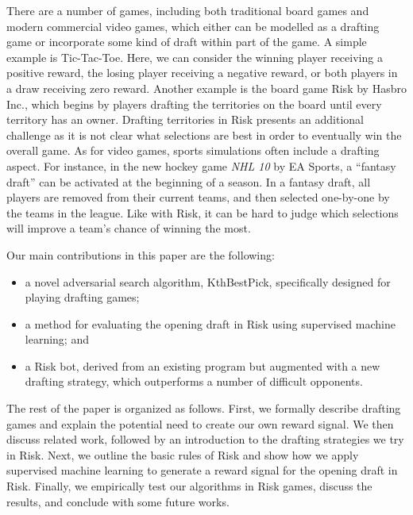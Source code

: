 \documentclass[letterpaper]{article}
\numberwithin{equation}{section}
\numberwithin{theorem}{section}
\numberwithin{lemma}{section}
\numberwithin{df}{section}
\begin{document}
There are a number of games, including both traditional board games and modern commercial video games, which either can be modelled as a drafting game or incorporate some kind of draft within part of the game.  A simple example is Tic-Tac-Toe. Here, we can consider the winning player receiving a positive reward, the losing player receiving a negative reward, or both players in a draw receiving zero reward. Another example is the board game Risk by Hasbro Inc., which begins by players drafting the territories on the board until every territory has an owner.  Drafting territories in Risk presents an additional challenge as it is not clear what selections are best in order to eventually win the overall game.  As for video games, sports simulations often include a drafting aspect.  For instance, %
in the new hockey game \textit{NHL 10} by EA Sports, a ``fantasy draft'' can be activated at the beginning of a season.  In a fantasy draft, all players are removed from their current teams, and then selected one-by-one by the teams in the league.  Like with Risk, it can be hard to judge which selections will improve a team's chance of winning the most.  %

Our main contributions in this paper are the following:
\begin{itemize} %
	\item a novel adversarial search algorithm, KthBestPick, specifically designed for playing drafting games;
	\item a method for evaluating the opening draft in Risk using supervised machine learning; and
	\item a Risk bot, derived from an existing program but augmented with a new drafting strategy, which outperforms a number of difficult opponents.
\end{itemize}
The rest of the paper is organized as follows.  First, we formally describe drafting games and explain the potential need to create our own reward signal.  We then discuss related work, followed by an introduction to the drafting strategies we try in Risk.  Next, we outline the basic rules of Risk and show how we apply supervised machine learning to generate a reward signal for the opening draft in Risk.  Finally, we empirically test our algorithms in Risk games, discuss the results, and conclude with some future works.
\end{document}
